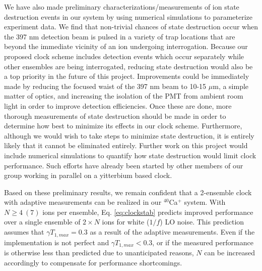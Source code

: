 We have also made preliminary characterizations/measurements of ion state destruction events in our system by using numerical simulations to parameterize experiment data. We find that non-trivial chances of state destruction occur when the 397 nm detection beam is pulsed in a variety of trap locations that are beyond the immediate vicinity of an ion undergoing interrogation. Because our proposed clock scheme includes detection events which occur separately while other ensembles are being interrogated, reducing state destruction would also be a top priority in the future of this project. Improvements could be immediately made by reducing the focused waist of the 397 nm beam to 10-15 $\mu$m, a simple matter of optics, and increasing the isolation of the PMT from ambient room light in order to improve detection efficiencies. Once these are done, more thorough measurements of state destruction should be made in order to determine how best to minimize its effects in our clock scheme. Furthermore, although we would wish to take steps to minimize state destruction, it is entirely likely that it cannot be eliminated entirely. Further work on this project would include numerical simulations to quantify how state destruction would limit clock performance. Such efforts have already been started by other members of our group working in parallel on a yitterbium based clock. 

Based on these preliminary results, we remain confident that a 2-ensemble clock with adaptive measurements can be realized in our  $^{40}$Ca$^+$ system. With $N \geq 4 \ (7)$ ions per ensemble, Eq. \ref{eq:clockstab} predicts improved performance over a single ensemble of $2 \times N$ ions for white ($1/f$) LO noise. This prediction assumes that $\gamma T_{1,max} = 0.3$ as a result of the adaptive measurements. Even if the implementation is not perfect and $\gamma T_{1,max} < 0.3$, or if the measured performance is otherwise less than predicted due to unanticipated reasons, $N$ can be increased accordingly to compensate for performance shortcomings.  